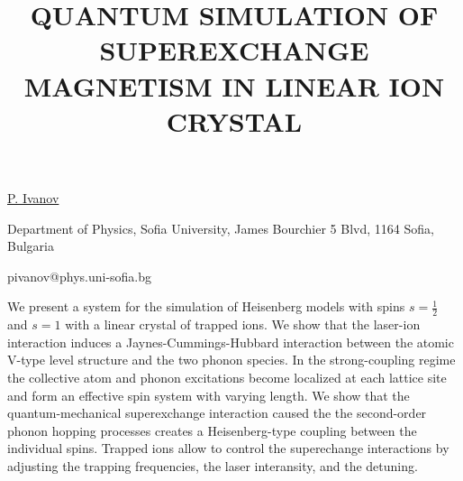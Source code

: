 \title{QUANTUM SIMULATION OF SUPEREXCHANGE MAGNETISM IN LINEAR ION CRYSTAL}

\underline{P. Ivanov} 

{\normalsize{\vspace{-4mm}
Department of Physics, Sofia University, James Bourchier 5 Blvd, 1164 Sofia, Bulgaria

\email pivanov@phys.uni-sofia.bg}}

We present a system for the simulation of Heisenberg models with spins $s=\frac{1}{2}$ and $s=1$ with a linear crystal of trapped ions. We show that the laser-ion interaction induces a Jaynes-Cummings-Hubbard interaction between the atomic V-type level structure and the two phonon species. In the strong-coupling regime the collective atom and phonon excitations become localized at each lattice site and form an effective spin system with varying length. We show that the quantum-mechanical superexchange interaction caused the the second-order phonon hopping processes creates a Heisenberg-type coupling between the individual spins. Trapped ions allow to control the superechange interactions by adjusting the trapping frequencies, the laser interansity, and the detuning.


\vspace{\baselineskip}
